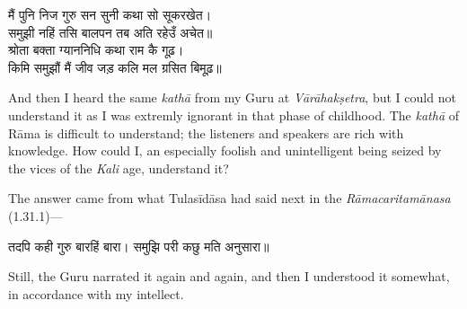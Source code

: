 \vspace{-2mm}
\begin{center}
मैं पुनि निज गुरु सन सुनी कथा सो सूकरखेत।\nopagebreak\\
समुझी नहिं तसि बालपन तब अति रहेउँ अचेत॥\\
श्रोता बक्ता ग्याननिधि कथा राम कै गूढ़।\nopagebreak\\
किमि समुझौं मैं जीव जड़ कलि मल ग्रसित बिमूढ़॥\nopagebreak\\
\end{center}
\vspace{-2mm}
\begin{sloppypar}\justifying\noindent\hspace{10mm} {\engtextfont \lqtwo And then I heard the same \textit{kathā} from my Guru at \textit{Vārāhakṣetra}, but I could not understand it as I was extremly ignorant in that phase of childhood. The \textit{kathā} of Rāma is difficult to understand; the listeners and speakers are rich with knowledge. How could I, an especially foolish and unintelligent being seized by the vices of the \textit{Kali} age, understand it?\rqtwo}\end{sloppypar}
\begin{sloppypar}\justifying\noindent\hspace{10mm} {\engtextfont The answer came from what Tulasīdāsa had said next in the 	\textit{Rāmacaritamānasa} (1.31.1)—}\end{sloppypar}
\vspace{-2mm}
\begin{center}
तदपि कही गुरु बारहिं बारा। समुझि परी कछु मति अनुसारा॥\nopagebreak\\
\end{center}
\vspace{-2mm}
\begin{sloppypar}\justifying\noindent\hspace{10mm} {\engtextfont \lqtwo Still, the Guru narrated it again and again, and then I understood it somewhat, in accordance with my intellect.\rqtwo}\end{sloppypar}
